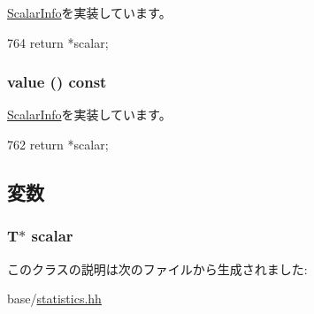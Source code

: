 \hyperlink{classStats_1_1ScalarInfo_ab152b7e89b37a7db03b04d500ceb8349}{ScalarInfo}を実装しています。


\begin{DoxyCode}
764 { return *scalar; }
\end{DoxyCode}
\hypertarget{classStats_1_1ValueProxy_aa9e486cb7eb0ad44f5f89923594b68a4}{
\subsubsection[{value}]{ value () const}}
\label{classStats_1_1ValueProxy_aa9e486cb7eb0ad44f5f89923594b68a4}


\hyperlink{classStats_1_1ScalarInfo_a1fb831559ad900460c4c9e4f546cd234}{ScalarInfo}を実装しています。


\begin{DoxyCode}
762 { return *scalar; }
\end{DoxyCode}


\subsection{変数}
\hypertarget{classStats_1_1ValueProxy_a40439de2c1c4f0a5e1b1fa557cc69c0e}{
\subsubsection[{scalar}]{\setlength{\rightskip}{0pt plus 5cm}T$\ast$ {\bf scalar}}}
\label{classStats_1_1ValueProxy_a40439de2c1c4f0a5e1b1fa557cc69c0e}


このクラスの説明は次のファイルから生成されました:\begin{DoxyCompactItemize}
\item 
base/\hyperlink{statistics_8hh}{statistics.hh}\end{DoxyCompactItemize}
